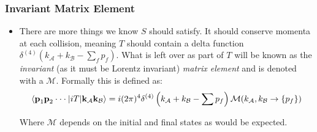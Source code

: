 \documentclass[11pt]{article}
\numberwithin{equation}{section}
\begin{document}
\subsubsection{Invariant Matrix Element} %
\label{ssub:invariant_matrix_element}
\begin{itemize}
  \item There are more things we know $S$ should satisfy. It should conserve momenta at each collision, meaning $T$ should contain a delta function $\delta^{(4)}(k_{\mathcal{A}}+k_{\mathcal{B}} - \sum_{f}p_f)$. What is left over as part of $T$ will be known as the \emph{invariant} (as it must be Lorentz invariant) \emph{matrix element} and is denoted with a $\mathcal{M}$. Formally this is defined as:
 \begin{align}
 \label{M_matrix}
   \braket{\textbf{p}_1\textbf{p}_2 \cdot \cdot \cdot|iT|\textbf{k}_{\mathcal{A}}\textbf{k}_{\mathcal{B}}} = i(2\pi)^4\delta^{(4)}\left(k_{\mathcal{A}}+k_{\mathcal{B}} - \sum p_f\right)\mathcal{M}(k_{\mathcal{A}},k_{\mathcal{B}} \rightarrow \{p_f\})
 \end{align}

 Where $\mathcal{M}$ depends on the initial and final states as would be expected. 
\end{itemize}
\end{document}
